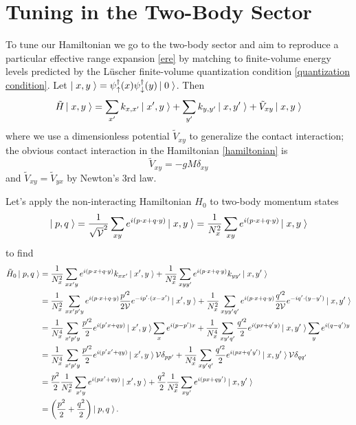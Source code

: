 \section{Tuning in the Two-Body Sector}\label{sec:tuning}

To tune our Hamiltonian we go to the two-body sector and aim to reproduce a particular effective range expansion \eqref{ere} by matching to finite-volume energy levels predicted by the L\"{u}scher finite-volume quantization condition \eqref{quantization condition}.
Let $\left|\;x,y\;\right\rangle = \psi{}^{\dagger}_{\uparrow}(x) \psi{}^{\dagger}_{\downarrow}(y) \left|\;0\;\right\rangle$.
Then
\begin{equation}
    \tilde{H} \left|\;x,y\;\right\rangle = \sum_{x'} k_{x,x'}\left|\;x',y\;\right\rangle + \sum_{y'} k_{y,y'}\left|\;x,y'\;\right\rangle + \tilde{V}_{xy} \left|\;x,y\;\right\rangle
\end{equation}
where we use a dimensionless potential $\tilde{V}_{xy}$ to generalize the contact interaction;
the obvious contact interaction in the Hamiltonian \eqref{hamiltonian} is
\begin{equation}
    \tilde{V}_{xy} = - gM \delta_{xy}
\end{equation}
and $\tilde{V}_{xy}=\tilde{V}_{yx}$ by Newton's 3rd law.

Let's apply the non-interacting Hamiltonian $H_0$ to two-body momentum states
\begin{equation}
    \left|\;p,q\;\right\rangle 
    =
    \frac{1}{\sqrt{\mathcal{V}}^2}\sum_{xy} e^{i(p\cdot x + q \cdot y)} \left|\;x,y\;\right\rangle
    =
    \frac{1}{N_x^2}\sum_{xy} e^{i(p\cdot x + q \cdot y)} \left|\;x,y\;\right\rangle
\end{equation}
to find
\begin{align}
    \tilde{H}_0 \left|\;p,q\;\right\rangle
    &=
            \frac{1}{N_x^2} \sum_{xx'y} e^{i(p\cdot x + q \cdot y)} k_{xx'}\left|\;x',y\;\right\rangle
        +   \frac{1}{N_x^2} \sum_{xyy'} e^{i(p\cdot x + q \cdot y)} k_{yy'}\left|\;x,y'\;\right\rangle
    \\
    &=
            \frac{1}{N_x^2} \sum_{xx'p'y} e^{i(p\cdot x + q \cdot y)} \frac{p'^2}{2\mathcal{V}} e^{-i p'\cdot(x-x')}\left|\;x',y\;\right\rangle
        +   \frac{1}{N_x^2} \sum_{xyy'q'} e^{i(p\cdot x + q \cdot y)} \frac{q'^2}{2\mathcal{V}} e^{-i q'\cdot(y-y')}\left|\;x,y'\;\right\rangle
    \\
    &=
            \frac{1}{N_x^4} \sum_{x'p'y} \frac{p'^2}{2} e^{i(p'x+qy)} \left|\;x',y\;\right\rangle \sum_{x} e^{i(p-p')x}
        +   \frac{1}{N_x^4} \sum_{xy'q'} \frac{q'^2}{2} e^{i(px+q'y)} \left|\;x,y'\;\right\rangle \sum_{y} e^{i(q-q')y}
    \\
    &=
            \frac{1}{N_x^4} \sum_{x'p'y} \frac{p'^2}{2} e^{i(p'x'+qy)} \left|\;x',y\;\right\rangle \mathcal{V} \delta_{pp'}
        +   \frac{1}{N_x^4} \sum_{xy'q'} \frac{q'^2}{2} e^{i(px+q'y')} \left|\;x,y'\;\right\rangle \mathcal{V} \delta_{qq'}
    \\
    &=
            \frac{p^2}{2} \frac{1}{N_x^2}\sum_{x'y} e^{i(px'+qy)} \left|\;x',y\;\right\rangle
        +   \frac{q^2}{2} \frac{1}{N_x^2}\sum_{xy'} e^{i(px+qy')} \left|\;x,y'\;\right\rangle
    \\
    &=
        \left(\frac{p^2}{2} + \frac{q^2}{2}\right) \left|\;p,q\;\right\rangle.
\end{align}


